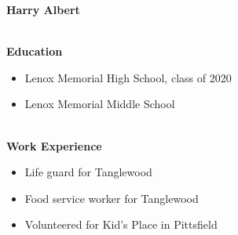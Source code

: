 \documentclass[10pt]{extarticle}
\begin{document}
\thispagestyle{empty}
\vspace{-\baselineskip}
\begin{center}
\Large \textbf{Harry Albert}
\end{center}
\vspace{-6.5ex}~\\ 
\textbf{Education}\\ 
\vspace{-\baselineskip}
\begin{itemize}[noitemsep,nolistsep]
\item Lenox Memorial High School, class of 2020
\item Lenox Memorial Middle School
\end{itemize}~\\[-1ex]
\textbf{Work Experience}\\ 
\vspace{-\baselineskip}
\begin{itemize}[noitemsep,nolistsep]
\item Life guard for Tanglewood
\item Food service worker for Tanglewood
\item Volunteered for Kid's Place in Pittsfield
\end{itemize}
\end{document}
